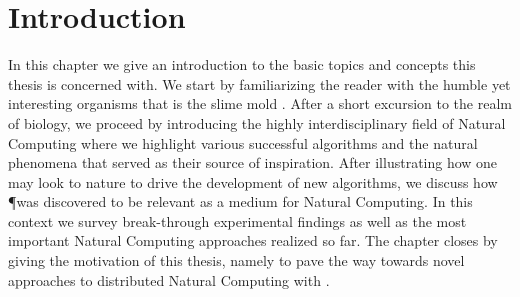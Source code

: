 \chapter{Introduction}

In this chapter we give an introduction to the basic topics and concepts this thesis is concerned with. We start by familiarizing the reader with the humble yet interesting organisms that is the slime mold \Pp. After a short excursion to the realm of biology, we proceed by introducing the highly interdisciplinary field of Natural Computing where we highlight various successful algorithms and the natural phenomena that served as their source of inspiration. After illustrating how one may look to nature to drive the development of new algorithms, we discuss how \P was discovered to be relevant as a medium for Natural Computing. In this context we survey break-through experimental findings as well as the most important Natural Computing approaches realized so far. The chapter closes by giving the motivation of this thesis, namely to pave the way towards novel approaches to distributed Natural Computing with \Pp.







